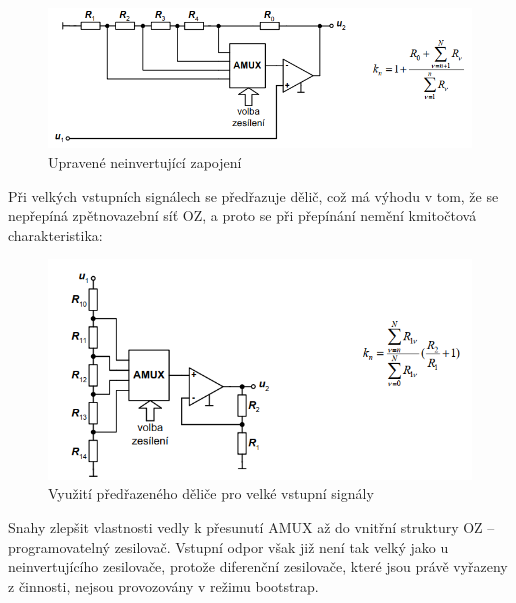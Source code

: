 \begin{figure}[h]
   \begin{center}
     \includegraphics[scale=0.6]{images/Amux4.png}
   \end{center}
   \caption{Upravené neinvertující zapojení}
\end{figure}

Při velkých vstupních signálech se předřazuje dělič, což má výhodu v tom, že se nepřepíná zpětnovazební síť OZ, a proto se při přepínání nemění kmitočtová charakteristika:
\begin{figure}[h]
   \begin{center}
     \includegraphics[scale=0.6]{images/Amux5.png}
   \end{center}
   \caption{Využití předřazeného děliče pro velké vstupní signály}
\end{figure}

Snahy zlepšit vlastnosti vedly k přesunutí AMUX až do vnitřní struktury OZ – programovatelný zesilovač. Vstupní odpor však již není tak velký jako u neinvertujícího zesilovače, protože diferenční zesilovače, které jsou právě vyřazeny z činnosti, nejsou provozovány v režimu bootstrap.

